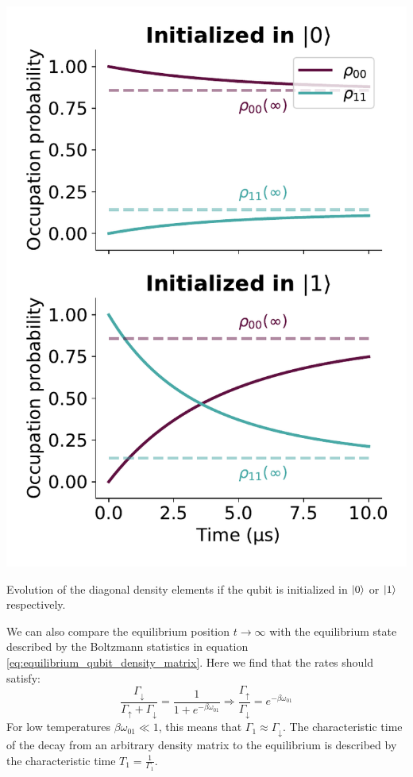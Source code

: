 \begin{marginfigure}
    \centering
    \includegraphics[]{Simulations/simulations_of_calibrations/Figs/qubit_T1_theroy.pdf}
    \caption{Evolution of the diagonal density elements if the qubit is initialized in $\ket{0}$ or $\ket{1}$ respectively.}
    \label{fig:qubit_t1_theory}
\end{marginfigure}
We can also compare the equilibrium position $t\to\infty$ with the equilibrium state described by the Boltzmann statistics in equation \ref{eq:equilibrium_qubit_density_matrix}. Here we find that the rates should satisfy:
\begin{equation}
    \frac{\Gamma_\downarrow}{\Gamma_\uparrow + \Gamma_\downarrow} = \frac{1}{1 + e^{-\beta\omega_{01}}} \Rightarrow \frac{\Gamma_\uparrow}{\Gamma_\downarrow} =e^{-\beta\omega_{01}} 
\end{equation}
For low temperatures $\beta \omega_{01} \ll 1$, this means that $\Gamma_1 \approx \Gamma_\downarrow$. The characteristic time of the decay from an arbitrary density matrix to the equilibrium is described by the characteristic time $T_1 = \frac{1}{\Gamma_1}$.

